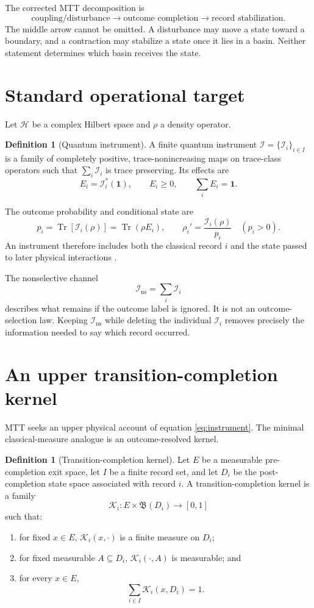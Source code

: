 \documentclass[11pt,a4paper]{article}
\theoremstyle{definition}
\newtheorem{definition}[theorem]{Definition}
\theoremstyle{remark}
\newcommand{\Tr}{\operatorname{Tr}}
\newcommand{\id}{\mathbf{1}}
\newcommand{\cH}{\mathcal{H}}
\newcommand{\cI}{\mathcal{I}}
\newcommand{\cK}{\mathcal{K}}
\begin{document}
The corrected MTT decomposition is
\[
\boxed{
\text{coupling/disturbance}
\longrightarrow
\text{outcome completion}
\longrightarrow
\text{record stabilization}.
}
\]
The middle arrow cannot be omitted. A disturbance may move a state toward a
boundary, and a contraction may stabilize a state once it lies in a basin.
Neither statement determines which basin receives the state.

\section{Standard operational target}

Let \(\cH\) be a complex Hilbert space and \(\rho\) a density operator.

\begin{definition}[Quantum instrument]
A finite quantum instrument
\(\cI=\{\cI_i\}_{i\in I}\) is a family of completely positive,
trace-nonincreasing maps on trace-class operators such that
\(\sum_i\cI_i\) is trace preserving. Its effects are
\[
E_i=\cI_i^*(\id),\qquad
E_i\geq0,\qquad
\sum_iE_i=\id.
\]
\end{definition}

The outcome probability and conditional state are
\begin{equation}
p_i=\Tr[\cI_i(\rho)]=\Tr(\rho E_i),
\qquad
\rho_i'=\frac{\cI_i(\rho)}{p_i}
\quad(p_i>0).
\label{eq:instrument}
\end{equation}
An instrument therefore includes both the classical record \(i\) and the
state passed to later physical interactions \cite{DaviesLewis1970}.

The nonselective channel
\[
\cI_{\mathrm{ns}}=\sum_i\cI_i
\]
describes what remains if the outcome label is ignored. It is not an
outcome-selection law. Keeping \(\cI_{\mathrm{ns}}\) while deleting the
individual \(\cI_i\) removes precisely the information needed to say which
record occurred.

\section{An upper transition-completion kernel}

MTT seeks an upper physical account of equation \eqref{eq:instrument}. The
minimal classical-measure analogue is an outcome-resolved kernel.

\begin{definition}[Transition-completion kernel]
Let \(E\) be a measurable pre-completion exit space, let \(I\) be a finite
record set, and let \(D_i\) be the post-completion state space associated with
record \(i\). A transition-completion kernel is a family
\[
\cK_i:E\times\mathfrak{B}(D_i)\longrightarrow[0,1]
\]
such that:
\begin{enumerate}
\item for fixed \(x\in E\), \(\cK_i(x,\cdot)\) is a finite measure on \(D_i\);
\item for fixed measurable \(A\subseteq D_i\),
\(\cK_i(\cdot,A)\) is measurable; and
\item for every \(x\in E\),
\[
\sum_{i\in I}\cK_i(x,D_i)=1.
\]
\end{enumerate}
\end{definition}
\end{document}

